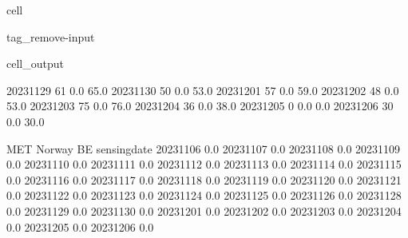 \documentclass[letterpaper,10pt,english]{jupyterBook}
\begin{document}
\begin{sphinxuseclass}{cell}
\begin{sphinxuseclass}{tag_remove-input}
\begin{sphinxVerbatimOutput}
\begin{sphinxuseclass}{cell_output}
\begin{sphinxVerbatim}[commandchars=\\\{\}]
2023\PYGZhy{}11\PYGZhy{}29               61                    0.0                   65.0   
2023\PYGZhy{}11\PYGZhy{}30               50                    0.0                   53.0   
2023\PYGZhy{}12\PYGZhy{}01               57                    0.0                   59.0   
2023\PYGZhy{}12\PYGZhy{}02               48                    0.0                   53.0   
2023\PYGZhy{}12\PYGZhy{}03               75                    0.0                   76.0   
2023\PYGZhy{}12\PYGZhy{}04               36                    0.0                   38.0   
2023\PYGZhy{}12\PYGZhy{}05                0                    0.0                    0.0   
2023\PYGZhy{}12\PYGZhy{}06               30                    0.0                   30.0   

              MET Norway BE  
sensing\PYGZus{}date                 
2023\PYGZhy{}11\PYGZhy{}06              0.0  
2023\PYGZhy{}11\PYGZhy{}07              0.0  
2023\PYGZhy{}11\PYGZhy{}08              0.0  
2023\PYGZhy{}11\PYGZhy{}09              0.0  
2023\PYGZhy{}11\PYGZhy{}10              0.0  
2023\PYGZhy{}11\PYGZhy{}11              0.0  
2023\PYGZhy{}11\PYGZhy{}12              0.0  
2023\PYGZhy{}11\PYGZhy{}13              0.0  
2023\PYGZhy{}11\PYGZhy{}14              0.0  
2023\PYGZhy{}11\PYGZhy{}15              0.0  
2023\PYGZhy{}11\PYGZhy{}16              0.0  
2023\PYGZhy{}11\PYGZhy{}17              0.0  
2023\PYGZhy{}11\PYGZhy{}18              0.0  
2023\PYGZhy{}11\PYGZhy{}19              0.0  
2023\PYGZhy{}11\PYGZhy{}20              0.0  
2023\PYGZhy{}11\PYGZhy{}21              0.0  
2023\PYGZhy{}11\PYGZhy{}22              0.0  
2023\PYGZhy{}11\PYGZhy{}23              0.0  
2023\PYGZhy{}11\PYGZhy{}24              0.0  
2023\PYGZhy{}11\PYGZhy{}25              0.0  
2023\PYGZhy{}11\PYGZhy{}26              0.0  
2023\PYGZhy{}11\PYGZhy{}28              0.0  
2023\PYGZhy{}11\PYGZhy{}29              0.0  
2023\PYGZhy{}11\PYGZhy{}30              0.0  
2023\PYGZhy{}12\PYGZhy{}01              0.0  
2023\PYGZhy{}12\PYGZhy{}02              0.0  
2023\PYGZhy{}12\PYGZhy{}03              0.0  
2023\PYGZhy{}12\PYGZhy{}04              0.0  
2023\PYGZhy{}12\PYGZhy{}05              0.0  
2023\PYGZhy{}12\PYGZhy{}06              0.0  
\end{sphinxVerbatim}

\end{sphinxuseclass}\end{sphinxVerbatimOutput}

\end{sphinxuseclass}
\end{sphinxuseclass}
\end{document}
